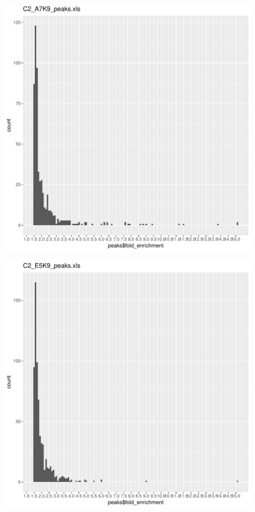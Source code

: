 \documentclass{article}\usepackage[]{graphicx}\usepackage[]{color}
\makeatletter
\def\maxwidth{ %
  \ifdim\Gin@nat@width>\linewidth
    \linewidth
  \else
    \Gin@nat@width
  \fi
}
\newenvironment{knitrout}{}{} %
\makeatother
\begin{document}
\begin{knitrout}
\includegraphics[width=\maxwidth]{figure/unnamed-chunk-2-16} 

\includegraphics[width=\maxwidth]{figure/unnamed-chunk-2-17} 


\end{knitrout}
\end{document}
